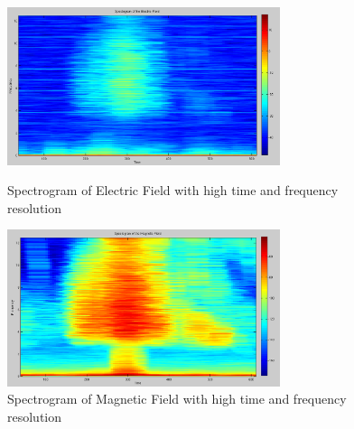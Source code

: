 \documentclass{article}
\begin{document}
\begin{figure}[htb!]
\begin{minipage}[c]{0.5\linewidth}
\centering
\includegraphics[width=8cm]{Figures/spectrogram_electricHR.png}
\caption{Spectrogram of Electric Field with high time and frequency resolution}
\label{fig:spectrogram_electricHR}
\end{minipage}
\hspace{0.1cm}
\begin{minipage}[c]{0.5\linewidth}
\centering
\includegraphics[width=8cm]{Figures/spectrogram_magneticHR.png}
\caption{Spectrogram of Magnetic Field with high time and frequency resolution}
\label{fig:spectrogram_magneticHR}
\end{minipage}
\end{figure}
\end{document}
